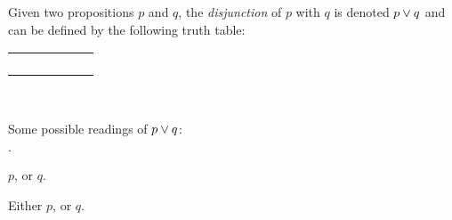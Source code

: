 \begin{definition}[Disjunction]
    \begin{center}
        \begin{minipage}[t]{.55\linewidth}
            Given two propositions \(p\) and \(q\), the \emph{disjunction} of \(p\) with \(q\)
            is denoted \(p \vee q\) and can be defined by the following truth table:
            \begin{table}[H]
                \centering
                \label{tab:or}
                \begin{tabular}{|CcCc||Cc|} \hline
                     &  &  \\ \hline
                    \thead{\(\top\)} & \thead{\(\top\)} &  \\
                    \thead{\(\top\)} & \thead{\(\bot\)} &  \\
                    \thead{\(\bot\)} & \thead{\(\top\)} &  \\
                    \thead{\(\bot\)} & \thead{\(\bot\)} &  \\ \hline
                \end{tabular}
            \end{table}
        \end{minipage}%
        \begin{minipage}[t]{.05\linewidth}
            ~
        \end{minipage}%
        \begin{minipage}[t]{.4\linewidth}
            Some possible readings of \(p \vee q\):\\
            \begin{list}{\(\cdot\)}{}
                \item
                    \(p\), or \(q\).
                \item
                    Either \(p\), or \(q\).
            \end{list}
        \end{minipage}
    \end{center}
\end{definition}

\newpage

